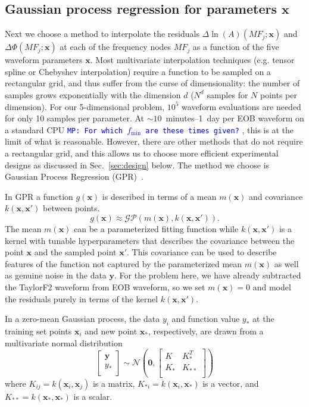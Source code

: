 \documentclass[prd,aps,letter,twocolumn,floatfix,notitlepage,nofootinbib]{revtex4-1}
\def\bx{\mathbf{x}}
\def\by{\mathbf{y}}
\newcommand{\MP}[1]{{\textcolor{blue}{\texttt{MP: #1}} }}
\begin{document}
\subsection{Gaussian process regression for parameters $\bx$}

Next we choose a method to interpolate the residuals $\Delta\ln(A)(MF_j; \bx)$ and $\Delta\Phi(MF_j; \bx)$ at each of the frequency nodes $MF_j$ as a function of the five waveform parameters $\bx$. Most multivariate interpolation techniques (e.g. tensor spline or Chebyshev interpolation) require a function to be sampled on a rectangular grid, and thus suffer from the curse of dimensionality: the number of samples grows exponentially with the dimension $d$ ($N^d$ samples for $N$ points per dimension). For our 5-dimensional problem, $10^5$ waveform evaluations are needed for only 10 samples per parameter. At $\sim10$~minutes--1~day per EOB waveform on a standard CPU \MP{For which $f_\text{min}$ are these times given?}, this is at the limit of what is reasonable. However, there are other methods that do not require a rectangular grid, and this allows us to choose more efficient experimental designs as discussed in Sec.~\ref{sec:design} below. The method we choose is Gaussian Process Regression (GPR)~\cite{RasmussenWilliams2006}.

In GPR a function $g(\bx)$ is described in terms of a mean $m(\bx)$ and  covariance $k(\bx, \bx')$ between points.
\begin{equation}
g(\bx) \approx \mathcal{GP}(m(\bx), k(\bx, \bx')).
\end{equation}
The mean $m(\bx)$ can be a parameterized fitting function while $k(\bx, \bx')$ is a kernel with tunable hyperparameters that describes the covariance between the point $\bx$ and the sampled point $\bx'$. This covariance can be used to describe features of the function not captured by the parameterized mean $m(\bx)$ as well as genuine noise in the data $\by$. For the problem here, we have already subtracted the TaylorF2 waveform from EOB waveform, so we set $m(\bx) = 0$ and model the residuals purely in terms of the kernel $k(\bx, \bx')$. 

In a zero-mean Gaussian process, the data $y_i$ and function value $y_*$ at the training set points $\bx_i$ and new point $\bx_*$, respectively, are drawn from a multivariate normal distribution
\begin{equation}
\label{eq:gaussian}
\begin{bmatrix}
{\bm y} \\
y_* \\
\end{bmatrix}
\sim \mathcal{N}
\left({\bm 0}, 
\begin{bmatrix}
K & K_*^T \\
K_* & K_{**} \\
\end{bmatrix}
\right)
\end{equation}
where $K_{ij} = k(\bx_i, \bx_j)$ is a matrix, $K_{*i} = k(\bx_i, \bx_*)$ is a vector, and $K_{**} = k(\bx_*, \bx_*)$ is a scalar.
\end{document}
